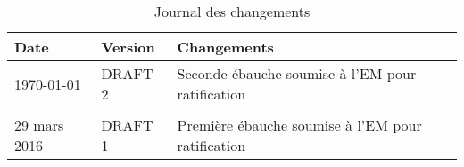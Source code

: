 
%

\begin{table}[h]

	\centering

	\begin{tabularx}{\textwidth}{ @{} p{4cm} p{3cm} X @{} }

		\textbf{Date} & \textbf{Version} & \textbf{Changements}\\ \toprule
		
		\today{} & DRAFT 2 & Seconde ébauche soumise à l'EM pour ratification\\
		
		\hrulefill&\hrulefill&\hrulefill\\

		29 mars 2016 & DRAFT 1 & Première ébauche soumise à l'EM pour ratification\\
		
		\bottomrule
		

	\end{tabularx}

	\caption[Changements]{Journal des changements}

	\label{record-of-changes}

\end{table} 